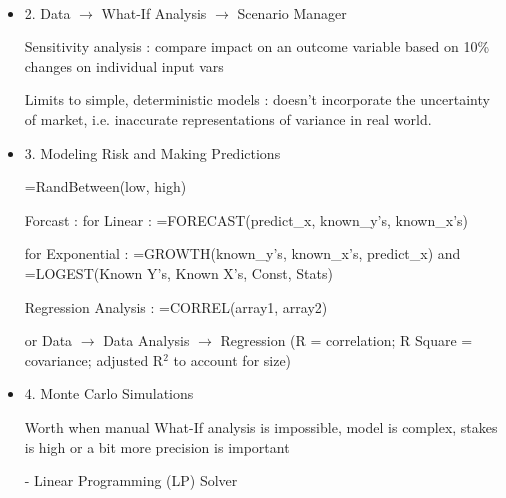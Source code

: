 \documentclass{article}
\begin{document}
\newcommand\independent{\protect\mathpalette{\protect\independenT}{\perp}}
\def\independenT#1#2{\mathrel{\rlap{$#1#2$}\mkern2mu{#1#2}}}

 \\


{}
\begin{itemize}
\item 2. Data $\rightarrow$ What-If Analysis $\rightarrow$ Scenario Manager

Sensitivity analysis : compare impact on an outcome variable based on 10\% changes on individual input vars

Limits to simple, deterministic models : doesn't incorporate the uncertainty of market, i.e. inaccurate representations of variance in real world.

\item 3. Modeling Risk and Making Predictions

=RandBetween(low, high)

Forcast : for Linear : =FORECAST(predict\_x, known\_y's, known\_x's)

for Exponential : =GROWTH(known\_y's, known\_x's, predict\_x) and =LOGEST(Known Y’s, Known X’s, Const, Stats)

Regression Analysis : =CORREL(array1, array2)

or Data $\rightarrow$ Data Analysis $\rightarrow$ Regression (R = correlation; R Square = covariance; adjusted R$^2$ to account for size)

\item 4. Monte Carlo Simulations

Worth when manual What-If analysis is impossible, model is complex, stakes is high or a bit more precision is important

- Linear Programming (LP) Solver
\end{itemize}
\end{document}
